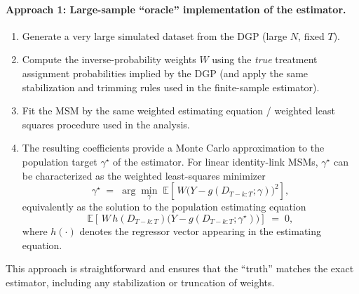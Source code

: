 \paragraph{Approach 1: Large-sample ``oracle'' implementation of the estimator.}
\begin{enumerate}
\item Generate a very large simulated dataset from the DGP (large $N$, fixed $T$).
\item Compute the inverse-probability weights $W$ using the \emph{true} treatment assignment
probabilities implied by the DGP (and apply the same stabilization and trimming rules used
in the finite-sample estimator).
\item Fit the MSM by the same weighted estimating equation / weighted least squares
procedure used in the analysis.
\item The resulting coefficients provide a Monte Carlo approximation to the population
target $\gamma^\star$ of the estimator. For linear identity-link MSMs, $\gamma^\star$
can be characterized as the weighted least-squares minimizer
\begin{equation}
\gamma^\star \;=\; \arg\min_{\gamma}\;
\mathbb E\!\left[\, W\Big(Y - g(D_{T-k:T};\gamma)\Big)^2 \right],
\end{equation}
equivalently as the solution to the population estimating equation
\begin{equation}
\mathbb E\!\left[\, W\, h(D_{T-k:T})
\Big(Y - g(D_{T-k:T};\gamma^\star)\Big)\right] \;=\; 0,
\end{equation}
where $h(\cdot)$ denotes the regressor vector appearing in the estimating equation.
\end{enumerate}
This approach is straightforward and ensures that the ``truth'' matches the exact
estimator, including any stabilization or truncation of weights.

